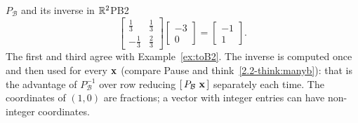 \documentclass[11pt]{article}
\begin{document}
\begin{exmp}{$P_{\mathcal{B}}$ and its inverse in $\mathbb{R}^2$}{PB2}
\[\begin{bmatrix}\tfrac13&\tfrac13\\-\tfrac13&\tfrac23\end{bmatrix}\begin{bmatrix}-3\\0\end{bmatrix}=\begin{bmatrix}-1\\1\end{bmatrix}.
\]
The first and third agree with Example~\ref{ex:toB2}. The inverse is computed once and then used for every $\mathbf{x}$ (compare Pause and think~\ref{2.2-think:manyb}): that is the advantage of $P_{\mathcal{B}}^{-1}$ over row reducing $[\,P_{\mathcal{B}}\ \bv{x}\,]$ separately each time. The coordinates of $(1,0)$ are fractions; a vector with integer entries can have non-integer coordinates.
\end{exmp}
\end{document}
